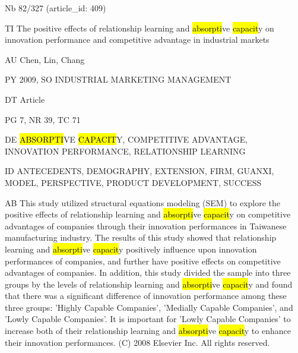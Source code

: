 \documentclass[a4paper]{article}
\begin{document}
\vspace*{-2cm}
Nb \tabto{0cm}82/327 (article\_id: 409)\par
TI \tabto{0cm}The positive effects of relationship learning and \hl{absorpti}ve \hl{capacit}y on innovation performance and competitive advantage in industrial markets\par
AU \tabto{0cm}Chen, Lin, Chang\par
PY \tabto{0cm}2009, SO INDUSTRIAL MARKETING MANAGEMENT\par
DT \tabto{0cm}Article\par
PG \tabto{0cm}7, NR 39, TC 71\par
DE \tabto{0cm}\hl{ABSORPTI}VE \hl{CAPACIT}Y, COMPETITIVE ADVANTAGE, INNOVATION PERFORMANCE, RELATIONSHIP LEARNING\par
ID \tabto{0cm}ANTECEDENTS, DEMOGRAPHY, EXTENSION, FIRM, GUANXI, MODEL, PERSPECTIVE, PRODUCT DEVELOPMENT, SUCCESS\par
AB \tabto{0cm}This study utilized structural equations modeling (SEM) to explore the positive effects of relationship learning and \hl{absorpti}ve \hl{capacit}y on competitive advantages of companies through their innovation performances in Taiwanese manufacturing industry. The results of this study showed that relationship learning and \hl{absorpti}ve \hl{capacit}y positively influence upon innovation performances of companies, and further have positive effects on competitive advantages of companies. In addition, this study divided the sample into three groups by the levels of relationship learning and \hl{absorpti}ve \hl{capacit}y and found that there was a significant difference of innovation performance among these three groups: 'Highly Capable Companies', 'Medially Capable Companies', and 'Lowly Capable Companies'. It is important for 'Lowly Capable Companies' to increase both of their relationship learning and \hl{absorpti}ve \hl{capacit}y to enhance their innovation performances. (C) 2008 Elsevier Inc. All rights reserved.\par
\clearpage
\end{document}
